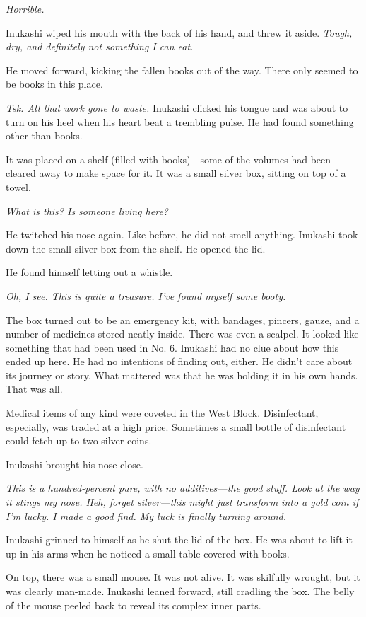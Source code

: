 \emph{Horrible.}

Inukashi wiped his mouth with the back of his hand, and threw it aside.
\emph{Tough, dry, and definitely not something I can eat.}

He moved forward, kicking the fallen books out of the way. There only
seemed to be books in this place.

\emph{Tsk. All that work gone to waste.} Inukashi clicked his tongue and was
about to turn on his heel when his heart beat a trembling pulse. He had
found something other than books.

It was placed on a shelf (filled with books)---some of the volumes had
been cleared away to make space for it. It was a small silver box,
sitting on top of a towel.

\mybreak

\emph{What is this? Is someone living here?}

He twitched his nose again. Like before, he did not smell anything.
Inukashi took down the small silver box from the shelf. He opened the
lid.

He found himself letting out a whistle.

\emph{Oh, I see. This is quite a treasure. I've found myself some booty.}

The box turned out to be an emergency kit, with bandages, pincers,
gauze, and a number of medicines stored neatly inside. There was even a
scalpel. It looked like something that had been used in No. 6. Inukashi
had no clue about how this ended up here. He had no intentions of
finding out, either. He didn't care about its journey or story. What
mattered was that he was holding it in his own hands. That was all.

Medical items of any kind were coveted in the West Block. Disinfectant,
especially, was traded at a high price. Sometimes a small bottle of
disinfectant could fetch up to two silver coins.

Inukashi brought his nose close.

\emph{This is a hundred-percent pure, with no additives---the good stuff. Look
at the way it stings my nose. Heh, forget silver---this might just
transform into a gold coin if I'm lucky. I made a good find. My luck is
finally turning around.}

Inukashi grinned to himself as he shut the lid of the box. He was about
to lift it up in his arms when he noticed a small table covered with
books.

On top, there was a small mouse. It was not alive. It was skilfully
wrought, but it was clearly man-made. Inukashi leaned forward, still
cradling the box. The belly of the mouse peeled back to reveal its
complex inner parts.

